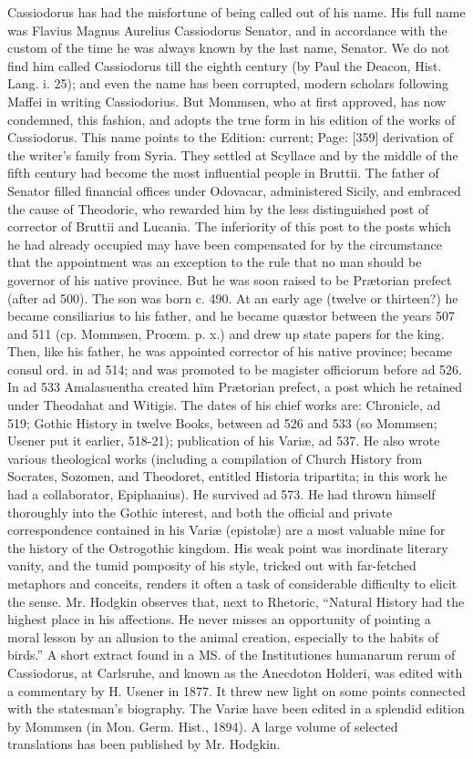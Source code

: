 Cassiodorus has had the misfortune of being called out of his name. His full name was Flavius Magnus Aurelius Cassiodorus Senator, and in accordance with the custom of the time he was always known by the last name, Senator. We do not find him called Cassiodorus till the eighth century (by Paul the Deacon, Hist. Lang. i. 25); and even the name has been corrupted, modern scholars following Maffei in writing Cassiodorius. But Mommsen, who at first approved, has now condemned, this fashion, and adopts the true form in his edition of the works of Cassiodorus. This name points to the Edition: current; Page: [359] derivation of the writer\texthebrew{}’s family from Syria. They settled at Scyllace and by the middle of the fifth century had become the most influential people in Bruttii. The father of Senator filled financial offices under Odovacar, administered Sicily, and embraced the cause of Theodoric, who rewarded him by the less distinguished post of corrector of Bruttii and Lucania. The inferiority of this post to the posts which he had already occupied may have been compensated for by the circumstance that the appointment was an exception to the rule that no man should be governor of his native province. But he was soon raised to be Prætorian prefect (after ad 500). The son was born c. 490. At an early age (twelve or thirteen?) he became consiliarius to his father, and he became quæstor between the years 507 and 511 (cp. Mommsen, Proœm. p. x.) and drew up state papers for the king. Then, like his father, he was appointed corrector of his native province; became consul ord. in ad 514; and was promoted to be magister officiorum before ad 526. In ad 533 Amalasuentha created him Prætorian prefect, a post which he retained under Theodahat and Witigis. The dates of his chief works are: Chronicle, ad 519; Gothic History in twelve Books, between ad 526 and 533 (so Mommsen; Usener put it earlier, 518-21); publication of his Variæ, ad 537. He also wrote various theological works (including a compilation of Church History from Socrates, Sozomen, and Theodoret, entitled Historia tripartita; in this work he had a collaborator, Epiphanius). He survived ad 573. He had thrown himself thoroughly into the Gothic interest, and both the official and private correspondence contained in his Variæ (epistolæ) are a most valuable mine for the history of the Ostrogothic kingdom. His weak point was inordinate literary vanity, and the tumid pomposity of his style, tricked out with far-fetched metaphors and conceits, renders it often a task of considerable difficulty to elicit the sense. Mr. Hodgkin observes that, next to Rhetoric, \texthebrew{“}Natural History had the highest place in his affections. He never misses an opportunity of pointing a moral lesson by an allusion to the animal creation, especially to the habits of birds.\texthebrew{}” A short extract found in a MS. of the Institutiones humanarum rerum of Cassiodorus, at Carlsruhe, and known as the Anecdoton Holderi, was edited with a commentary by H. Usener in 1877. It threw new light on some points connected with the statesman\texthebrew{}’s biography. The Variæ have been edited in a splendid edition by Mommsen (in Mon. Germ. Hist., 1894). A large volume of selected translations has been published by Mr. Hodgkin.

